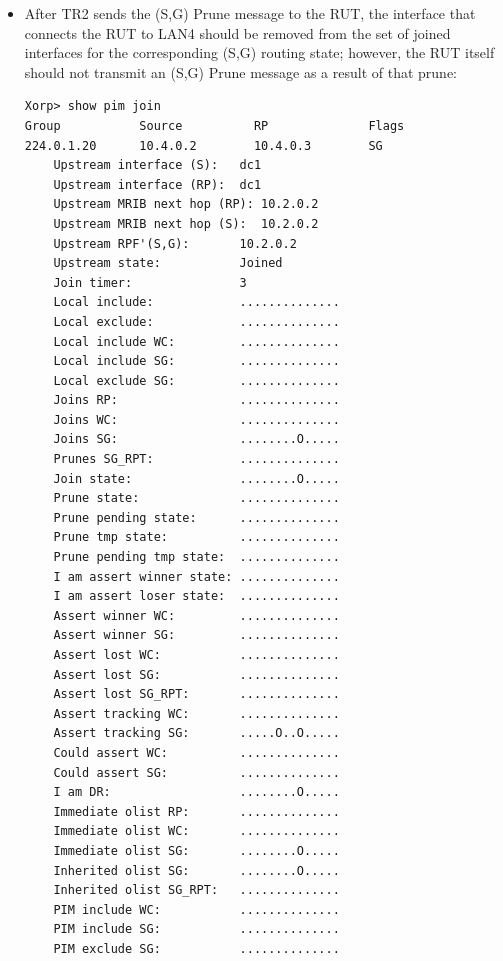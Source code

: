 \documentclass[11pt]{report}
\begin{document}
\begin{itemize}
  \item After TR2 sends the (S,G) Prune message to the RUT, the interface
  that connects the RUT to LAN4 should be removed from the set of joined
  interfaces for the corresponding (S,G) routing state; however, the RUT
  itself should not transmit an (S,G) Prune message as a result of that
  prune:

\begin{verbatim}
Xorp> show pim join 
Group           Source          RP              Flags
224.0.1.20      10.4.0.2        10.4.0.3        SG   
    Upstream interface (S):   dc1
    Upstream interface (RP):  dc1
    Upstream MRIB next hop (RP): 10.2.0.2
    Upstream MRIB next hop (S):  10.2.0.2
    Upstream RPF'(S,G):       10.2.0.2
    Upstream state:           Joined 
    Join timer:               3
    Local include:            ..............
    Local exclude:            ..............
    Local include WC:         ..............
    Local include SG:         ..............
    Local exclude SG:         ..............
    Joins RP:                 ..............
    Joins WC:                 ..............
    Joins SG:                 ........O.....
    Prunes SG_RPT:            ..............
    Join state:               ........O.....
    Prune state:              ..............
    Prune pending state:      ..............
    Prune tmp state:          ..............
    Prune pending tmp state:  ..............
    I am assert winner state: ..............
    I am assert loser state:  ..............
    Assert winner WC:         ..............
    Assert winner SG:         ..............
    Assert lost WC:           ..............
    Assert lost SG:           ..............
    Assert lost SG_RPT:       ..............
    Assert tracking WC:       ..............
    Assert tracking SG:       .....O..O.....
    Could assert WC:          ..............
    Could assert SG:          ..............
    I am DR:                  ........O.....
    Immediate olist RP:       ..............
    Immediate olist WC:       ..............
    Immediate olist SG:       ........O.....
    Inherited olist SG:       ........O.....
    Inherited olist SG_RPT:   ..............
    PIM include WC:           ..............
    PIM include SG:           ..............
    PIM exclude SG:           ..............
\end{verbatim}

\end{itemize}

\end{document}
